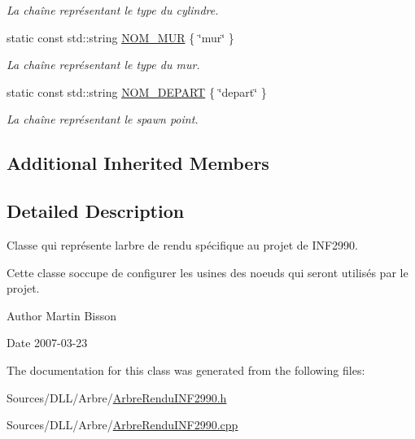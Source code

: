 \begin{DoxyCompactItemize}
\begin{DoxyCompactList}\small\item\em La chaîne représentant le type du cylindre. \end{DoxyCompactList}\item 
\hypertarget{group__inf2990_ga4d9c8c9bfa165dde522834dec2882039}{}static const std\+::string \hyperlink{group__inf2990_ga4d9c8c9bfa165dde522834dec2882039}{N\+O\+M\+\_\+\+M\+U\+R} \{ \char`\"{}mur\char`\"{} \}\label{group__inf2990_ga4d9c8c9bfa165dde522834dec2882039}

\begin{DoxyCompactList}\small\item\em La chaîne représentant le type du mur. \end{DoxyCompactList}\item 
\hypertarget{group__inf2990_ga7f23ccbd07f9afea9685f108c4053834}{}static const std\+::string \hyperlink{group__inf2990_ga7f23ccbd07f9afea9685f108c4053834}{N\+O\+M\+\_\+\+D\+E\+P\+A\+R\+T} \{ \char`\"{}depart\char`\"{} \}\label{group__inf2990_ga7f23ccbd07f9afea9685f108c4053834}

\begin{DoxyCompactList}\small\item\em La chaîne représentant le spawn point. \end{DoxyCompactList}\end{DoxyCompactItemize}
\subsection*{Additional Inherited Members}


\subsection{Detailed Description}
Classe qui représente l\textquotesingle{}arbre de rendu spécifique au projet de I\+N\+F2990. 

Cette classe s\textquotesingle{}occupe de configurer les usines des noeuds qui seront utilisés par le projet.

\begin{DoxyAuthor}{Author}
Martin Bisson 
\end{DoxyAuthor}
\begin{DoxyDate}{Date}
2007-\/03-\/23 
\end{DoxyDate}


The documentation for this class was generated from the following files\+:\begin{DoxyCompactItemize}
\item 
Sources/\+D\+L\+L/\+Arbre/\hyperlink{_arbre_rendu_i_n_f2990_8h}{Arbre\+Rendu\+I\+N\+F2990.\+h}\item 
Sources/\+D\+L\+L/\+Arbre/\hyperlink{_arbre_rendu_i_n_f2990_8cpp}{Arbre\+Rendu\+I\+N\+F2990.\+cpp}\end{DoxyCompactItemize}
